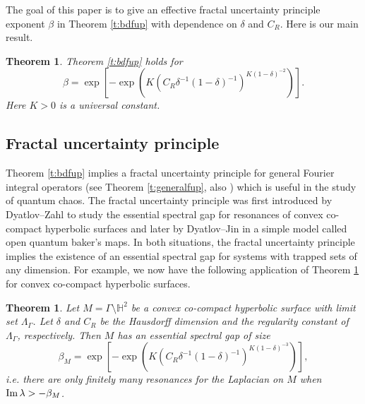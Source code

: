 \documentclass[reqno,12pt,letterpaper]{amsart}
\newtheorem{thm}[prop]{Theorem}
\numberwithin{equation}{section}
\numberwithin{prop}{section}
\renewcommand{\Im}{\mathop{\rm Im}\nolimits}
\begin{document}
The goal of this paper is to give an effective fractal uncertainty principle exponent $\beta$ in Theorem \ref{t:bdfup} with dependence on $\delta$ and $C_R$. Here is our main result.


\begin{thm}
\label{t:effup}
Theorem \ref{t:bdfup} holds for 
\begin{equation}
\label{e:fupexp}
\beta=\exp\left[-\exp\left(K(C_R\delta^{-1}(1-\delta)^{-1})^{K(1-\delta)^{-2}}\right)\right].
\end{equation}
Here $K>0$ is a universal constant.
\end{thm}


\subsection{Fractal uncertainty principle}
\label{s:app}

Theorem \ref{t:bdfup} implies a fractal uncertainty principle for general Fourier integral operators (see Theorem \ref{t:generalfup}, also \cite[\S 4.2]{fullgap}) which is useful in the study of quantum chaos. The fractal uncertainty principle was first introduced by Dyatlov--Zahl \cite{fup} to study the essential spectral gap for resonances of convex co-compact hyperbolic surfaces and later by Dyatlov--Jin \cite{oqm} in a simple model called open quantum baker's maps. In both situations, the fractal uncertainty principle implies the existence of an essential spectral gap for systems with trapped sets of any dimension. For example, we now have the following application of Theorem \ref{t:effup} for convex co-compact hyperbolic surfaces.

\begin{thm}
Let $M=\Gamma\setminus\mathbb{H}^2$ be a convex co-compact hyperbolic surface with limit set $\Lambda_\Gamma$. Let $\delta$ and $C_R$ be the Hausdorff dimension and the regularity constant of $\Lambda_\Gamma$, respectively. Then $M$ has an essential spectral gap of size 
\begin{equation*}
\beta_M=\exp\left[-\exp\left(K(C_R\delta^{-1}(1-\delta)^{-1})^{K(1-\delta)^{-3}}\right)\right],
\end{equation*}
i.e. there are only finitely many resonances for the Laplacian on $M$ when $\Im\lambda>-\beta_M$.
\end{thm}
\end{document}
